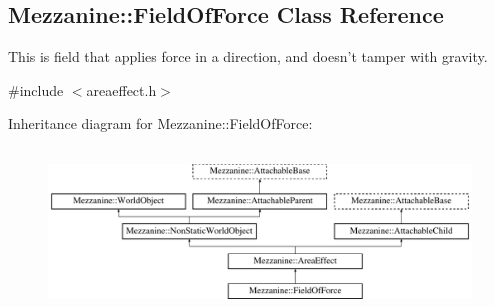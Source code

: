 \hypertarget{classMezzanine_1_1FieldOfForce}{
\subsection{Mezzanine::FieldOfForce Class Reference}
\label{classMezzanine_1_1FieldOfForce}
}


This is field that applies force in a direction, and doesn't tamper with gravity.  




{\ttfamily \#include $<$areaeffect.h$>$}

Inheritance diagram for Mezzanine::FieldOfForce:\begin{figure}[H]
\begin{center}
\leavevmode
\includegraphics[height=4.423381cm]{classMezzanine_1_1FieldOfForce}
\end{center}
\end{figure}
